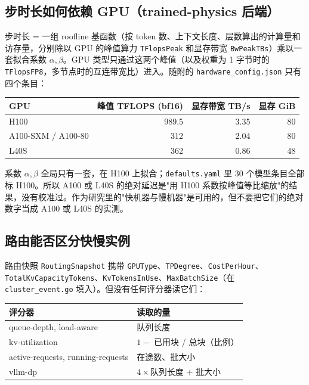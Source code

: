 \documentclass[11pt,a4paper,fontset=windows]{ctexart}
\begin{document}
\subsection{步时长如何依赖 GPU（trained-physics 后端）}

步时长 = 一组 roofline 基函数（按 token 数、上下文长度、层数算出的计算量和访存量，分别除以 GPU 的峰值算力 \texttt{TFlopsPeak} 和显存带宽 \texttt{BwPeakTBs}）乘以一套拟合系数 $\alpha,\beta$。GPU 类型只通过这两个峰值（以及权重为 1 字节时的 \texttt{TFlopsFP8}，多节点时的互连带宽比）进入。随附的 \texttt{hardware\_config.json} 只有四个条目：

\begin{center}\begin{tabular}{lrrr}\toprule
GPU & 峰值 TFLOPS (bf16) & 显存带宽 TB/s & 显存 GiB \\ \midrule
H100 & 989.5 & 3.35 & 80 \\
A100-SXM / A100-80 & 312 & 2.04 & 80 \\
L40S & 362 & 0.86 & 48 \\ \bottomrule
\end{tabular}\end{center}

系数 $\alpha,\beta$ 全局只有一套，在 H100 上拟合；\texttt{defaults.yaml} 里 30 个模型条目全部标 H100。所以 A100 或 L40S 的绝对延迟是"用 H100 系数按峰值等比缩放"的结果，没有校准过。作为研究里的"快机器与慢机器"是可用的，但不要把它们的绝对数字当成 A100 或 L40S 的实测。

\subsection{路由能否区分快慢实例}

路由快照 \texttt{RoutingSnapshot} 携带 \texttt{GPUType}、\texttt{TPDegree}、\texttt{CostPerHour}、\texttt{TotalKvCapacityTokens}、\texttt{KvTokensInUse}、\texttt{MaxBatchSize}（在 \texttt{cluster\_event.go} 填入）。但没有任何评分器读它们：

\begin{center}\begin{tabular}{ll}\toprule
评分器 & 读取的量 \\ \midrule
queue-depth, load-aware & 队列长度 \\
kv-utilization & $1 - $ 已用块 / 总块（比例） \\
active-requests, running-requests & 在途数、批大小 \\
vllm-dp & $4\times$队列长度 $+$ 批大小 \\ \bottomrule
\end{tabular}\end{center}
\end{document}
